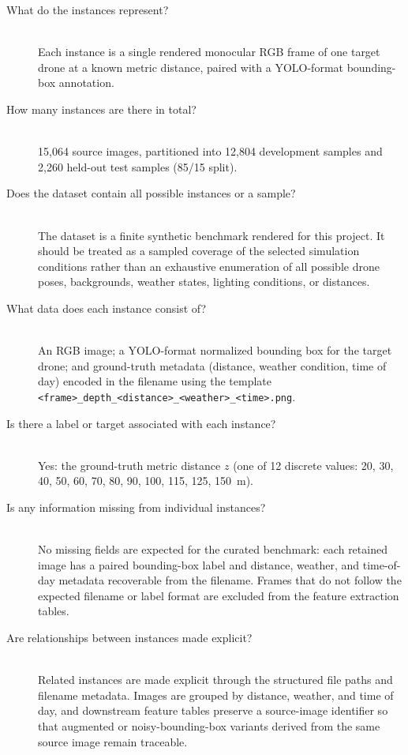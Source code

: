 \begin{description}
    \item[What do the instances represent?] \hfill \\{}
    Each instance is a single rendered monocular \ac{RGB} frame of one target
    drone at a known metric distance, paired with a YOLO-format bounding-box
    annotation.

    \item[How many instances are there in total?] \hfill \\{}
    15,064 source images, partitioned into 12,804 development samples and
    2,260 held-out test samples (85/15 split).

    \item[Does the dataset contain all possible instances or a sample?] \hfill \\{}
    The dataset is a finite synthetic benchmark rendered for this project. It
    should be treated as a sampled coverage of the selected simulation
    conditions rather than an exhaustive enumeration of all possible drone
    poses, backgrounds, weather states, lighting conditions, or distances.

    \item[What data does each instance consist of?] \hfill \\{}
    An \ac{RGB} image; a YOLO-format normalized bounding box for the target
    drone; and ground-truth metadata (distance, weather condition, time of
    day) encoded in the filename using the template
    \texttt{<frame>\_depth\_<distance>\_<weather>\_<time>.png}.

    \item[Is there a label or target associated with each instance?] \hfill \\{}
    Yes: the ground-truth metric distance $z$ (one of 12 discrete values:
    20, 30, 40, 50, 60, 70, 80, 90, 100, 115, 125, 150~m).

    \item[Is any information missing from individual instances?] \hfill \\{}
    No missing fields are expected for the curated benchmark: each retained
    image has a paired bounding-box label and distance, weather, and
    time-of-day metadata recoverable from the filename. Frames that do not
    follow the expected filename or label format are excluded from the feature
    extraction tables.

    \item[Are relationships between instances made explicit?] \hfill \\{}
    Related instances are made explicit through the structured file paths and
    filename metadata. Images are grouped by distance, weather, and time of day,
    and downstream feature tables preserve a source-image identifier so that
    augmented or noisy-bounding-box variants derived from the same source image
    remain traceable.


\end{description}

